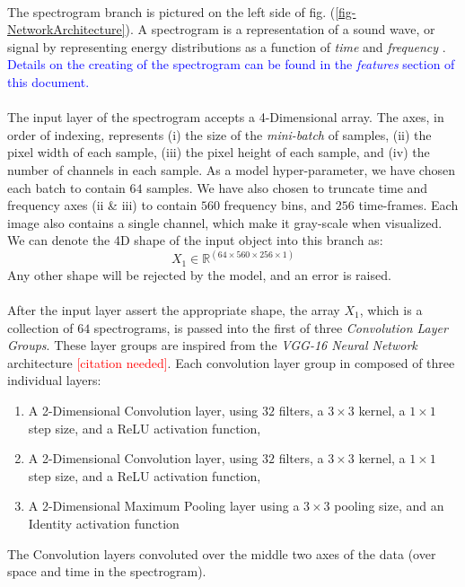 \documentclass[12pt,letterpaper]{article}
\begin{document}
\paragraph*{}The spectrogram branch is pictured on the left side of fig. (\ref{fig-NetworkArchitecture}). A spectrogram is a representation of a sound wave, or signal by representing energy distributions as a function of \textit{time} and \textit{frequency} \cite{White,Olsen,Kahn}. \textcolor{blue}{Details on the creating of the spectrogram can be found in the \textit{features} section of this document.}

\paragraph*{}The input layer of the spectrogram accepts a 4-Dimensional array. The axes, in order of indexing, represents (i) the size of the \textit{mini-batch} of samples, (ii) the pixel width of each sample, (iii) the pixel height of each sample, and (iv) the number of channels in each sample. As a model hyper-parameter, we have chosen each batch to contain $64$ samples. We have also chosen to truncate time and frequency axes (ii \& iii) to contain $560$ frequency bins, and $256$ time-frames. Each image also contains a single channel, which make it gray-scale when visualized. We can denote the 4D shape of the input object into this branch as:
\begin{equation}
\label{eqn-shapeX1}
X_1 \in \mathbb{R}^{(64 \times 560 \times 256 \times 1)}
\end{equation}
Any other shape will be rejected by the model, and an error is raised.

\paragraph*{}After the input layer assert the appropriate shape, the array $X_1$, which is a collection of $64$ spectrograms, is passed into the first of three \textit{Convolution Layer Groups}. These layer groups are inspired from the \textit{VGG-16 Neural Network} architecture \textcolor{red}{[citation needed]}. Each convolution layer group in composed of three individual layers: 
\begin{enumerate}
\item A 2-Dimensional Convolution layer, using $32$ filters, a $3 \times 3$ kernel, a $1 \times 1$ step size, and a ReLU activation function,
\item A 2-Dimensional Convolution layer, using $32$ filters, a $3 \times 3$ kernel, a $1 \times 1$ step size, and a ReLU activation function,
\item A 2-Dimensional Maximum Pooling layer using a $3 \times 3$ pooling size, and an Identity activation function
\end{enumerate}  
The Convolution layers convoluted over the middle two axes of the data (over space and time in the spectrogram). 
\end{document}
